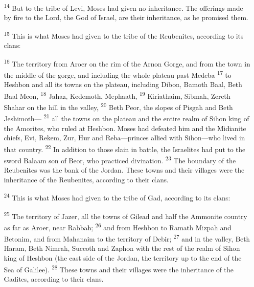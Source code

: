 \documentclass[12pt,twoside]{article}
\newcommand{\vs}[1]{\textsuperscript{#1}}
\begin{document}
\vs{14} But to the tribe of Levi, Moses had given no inheritance. The offerings made by fire to the Lord, the God of Israel, are their inheritance, as he promised them.\vspace{0.3cm}

\noindent \vs{15} This is what Moses had given to the tribe of the Reubenites, according to its clans:\vspace{0.3cm}

\begin{adjustwidth}{0.5cm}{0cm}
  \vs{16} The territory from Aroer on the rim of the Arnon Gorge, and from the town in the middle of the gorge, and including the whole plateau past Medeba
  \vs{17} to Heshbon and all its towns on the plateau, including Dibon, Bamoth Baal, Beth Baal Meon,
  \vs{18} Jahaz, Kedemoth, Mephaath,
  \vs{19} Kiriathaim, Sibmah, Zereth Shahar on the hill in the valley,
  \vs{20} Beth Peor, the slopes of Pisgah and Beth Jeshimoth---
  \vs{21} all the towns on the plateau and the entire realm of Sihon king of the Amorites, who ruled at Heshbon. Moses had defeated him and the Midianite chiefs, Evi, Rekem, Zur, Hur and Reba---princes allied with Sihon---who lived in that country.
  \vs{22} In addition to those slain in battle, the Israelites had put to the sword Balaam son of Beor, who practiced divination.
  \vs{23} The boundary of the Reubenites was the bank of the Jordan. These towns and their villages were the inheritance of the Reubenites, according to their clans.\vspace{0.3cm}
\end{adjustwidth}

\noindent \vs{24} This is what Moses had given to the tribe of Gad, according to its clans:\vspace{0.3cm}

\begin{adjustwidth}{0.5cm}{0cm}
  \vs{25} The territory of Jazer, all the towns of Gilead and half the Ammonite country as far as Aroer, near Rabbah;
  \vs{26} and from Heshbon to Ramath Mizpah and Betonim, and from Mahanaim to the territory of Debir;
  \vs{27} and in the valley, Beth Haram, Beth Nimrah, Succoth and Zaphon with the rest of the realm of Sihon king of Heshbon (the east side of the Jordan, the territory up to the end of the Sea of Galilee).
  \vs{28} These towns and their villages were the inheritance of the Gadites, according to their clans.\vspace{0.3cm}
\end{adjustwidth}
\end{document}
